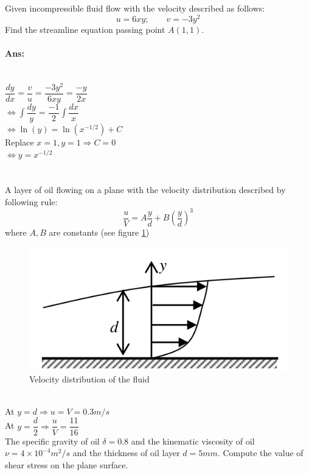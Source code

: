 \section{}
Given incompressible fluid flow with the velocity described as follows:
\[u=6xy;\qquad v =-3y^2\]
Find the streamline equation passing point $ A(1,1) $.
\paragraph{Ans:}$ $\\
$ \dfrac{dy}{dx} = \dfrac{v}{u} = \dfrac{-3y^2}{6xy} = \dfrac{-y}{2x} $\\
$\displaystyle \Leftrightarrow \int \dfrac{dy}{y} = \dfrac{-1}{2}\int \dfrac{dx}{x} $\\
$\Leftrightarrow \ln (y) = \ln (x^{-1/2}) + C $\\
Replace $ x=1,y=1\Rightarrow C = 0 $\\
$ \Leftrightarrow y = x^{-1/2} $
\section{}
A layer of oil flowing on a plane with the velocity distribution described by following rule:
\[\dfrac{u}{V} = A\dfrac{y}{d} + B\left(\dfrac{y}{d}\right)^3\]
where $ A,B $ are constants (see figure \ref{fig:2020-09-02_10-26-14})
\begin{figure}[h]
	\centering
	\includegraphics[width=0.4\linewidth]{"Screenshot_2020-09-02_10-26-14"}
	\caption{Velocity distribution of the fluid}
	\label{fig:2020-09-02_10-26-14}
\end{figure}\\
At $ y=d\Rightarrow u=V = 0.3\unit{m/s} $\\
At $ y=\dfrac{d}{2} \Rightarrow \dfrac{u}{V} = \dfrac{11}{16} $\\
The specific gravity of oil $ \delta =0.8$ and the kinematic viscosity of oil $ \nu = 4\times10^{-4}\unit{m^2/s} $ and the thickness of oil layer $ d=5\unit{mm} $. Compute the value of shear stress on the plane surface.
